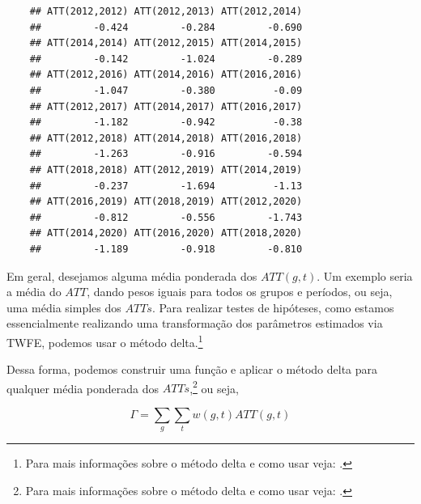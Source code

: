 \documentclass[portugues]{article}
\begin{document}
\begin{box_code}
    \begin{verbatim}
    ## ATT(2012,2012) ATT(2012,2013) ATT(2012,2014)
    ##         -0.424         -0.284         -0.690
    ## ATT(2014,2014) ATT(2012,2015) ATT(2014,2015)
    ##         -0.142         -1.024         -0.289
    ## ATT(2012,2016) ATT(2014,2016) ATT(2016,2016)
    ##         -1.047         -0.380          -0.09
    ## ATT(2012,2017) ATT(2014,2017) ATT(2016,2017) 
    ##         -1.182         -0.942          -0.38
    ## ATT(2012,2018) ATT(2014,2018) ATT(2016,2018)
    ##         -1.263         -0.916         -0.594
    ## ATT(2018,2018) ATT(2012,2019) ATT(2014,2019)
    ##         -0.237         -1.694          -1.13
    ## ATT(2016,2019) ATT(2018,2019) ATT(2012,2020)
    ##         -0.812         -0.556         -1.743
    ## ATT(2014,2020) ATT(2016,2020) ATT(2018,2020) 
    ##         -1.189         -0.918         -0.810
    \end{verbatim}

\end{box_code}

Em geral, desejamos alguma média ponderada dos $ATT(g,t)$. Um exemplo seria a média do $ATT$, dando pesos iguais para todos os grupos e períodos, ou seja, uma média simples dos $ATTs$. Para realizar testes de hipóteses, como estamos essencialmente realizando uma transformação dos parâmetros estimados via TWFE, podemos usar o método delta.\footnote{Para mais informações sobre o método delta e como usar veja: \cite{ver2012invented}.}

Dessa forma, podemos construir uma função e aplicar o método delta para qualquer média ponderada dos $ATTs$,\footnote{Para mais informações sobre o método delta e como usar veja: \cite{ver2012invented}.} ou seja,

$$ \Gamma = \sum_g \sum_t w(g,t) ATT(g,t) $$
\end{document}
